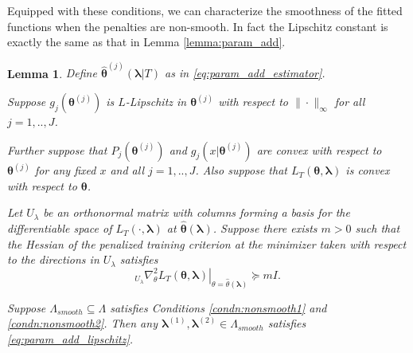 \documentclass[12pt]{article} %
\newtheorem{lemma}{Lemma}
\theoremstyle{definition}
\begin{document}
Equipped with these conditions, we can characterize the smoothness of the fitted functions when the penalties are non-smooth. In fact the Lipschitz constant is exactly the same as that in Lemma \ref{lemma:param_add}.

\begin{lemma}
	\label{lemma:nonsmooth}
	Define $\hat{\boldsymbol{\theta}}^{(j)}\left (\boldsymbol{\lambda} | T\right )$ as in \eqref{eq:param_add_estimator}.
	
	\noindent
	Suppose $g_j(\boldsymbol{\theta}^{(j)})$ is $L$-Lipschitz in $\boldsymbol{\theta}^{(j)}$ with respect to $\| \cdot \|_\infty$ for all $j=1,..,J$.
	
	\noindent		
	Further suppose that $P_j(\boldsymbol{\theta}^{(j)})$ and $g_j(x | \boldsymbol{\theta}^{(j)})$ are convex with respect to $\boldsymbol{\theta}^{(j)}$ for any fixed $x$ and all $j=1,..,J$.
	Also suppose that $L_T\left ( \boldsymbol{\theta} , \boldsymbol{\lambda} \right )$ is convex with respect to $\boldsymbol{\theta}$.
	
	Let $U_\lambda$ be an orthonormal matrix with columns forming a basis for the differentiable space of $L_T(\cdot , \boldsymbol{\lambda})$ at $\hat{\boldsymbol{\theta}}(\boldsymbol{\lambda})$. Suppose there exists $m > 0$ such that the Hessian of the penalized training criterion at the minimizer taken with respect to the directions in $U_\lambda$ satisfies 
	\begin{equation}
	\left . _{U_\lambda}\nabla_{\theta}^2 L_T(\boldsymbol{\theta}, \boldsymbol{\lambda}) \right |_{\theta = \hat{\theta}(\boldsymbol{\lambda})} \succeq mI.
	\end{equation}
	
	Suppose $\Lambda_{smooth} \subseteq \Lambda$ satisfies Conditions \ref{condn:nonsmooth1} and \ref{condn:nonsmooth2}. Then any $\boldsymbol{\lambda}^{(1)}, \boldsymbol{\lambda}^{(2)} \in \Lambda_{smooth}$ satisfies  \eqref{eq:param_add_lipschitz}.
\end{lemma}
\end{document}
